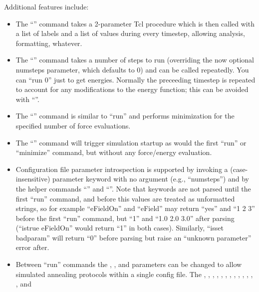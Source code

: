 Additional features include:
\begin{itemize}
 \item The ``'' command takes a 2-parameter Tcl procedure which
    is then called with a list of labels and a list of values during
    every timestep, allowing analysis, formatting, whatever.
 \item The ``'' command takes a number of steps to run (overriding the
    now optional numsteps parameter, which defaults to 0) and can be
    called repeatedly.  You can ``run 0'' just to get energies.
    Normally the preceeding timestep is repeated to account for any modifications to the
    energy function; this can be avoided with ``''.
 \item The ``'' command is similar to ``run'' and performs
    minimization for the specified number of force evaluations.
 \item The ``'' command will trigger simulation startup
    as would the first ``run'' or ``minimize'' command, but without any force/energy evaluation.
 \item Configuration file parameter introspection is supported by
   invoking a (case-insensitive) parameter keyword with no argument (e.g., ``numsteps'')
   and by the helper commands ``'' and ``''.
   Note that keywords are not parsed until the first ``run'' command, and
   before this values are treated as unformatted strings, so for example
   ``eFieldOn'' and ``eField'' may return ``yes'' and ``1 2 3'' before
   the first ``run'' command, but ``1'' and ``1.0 2.0 3.0'' after parsing
   (``istrue eFieldOn'' would return ``1'' in both cases).
   Similarly, ``isset badparam'' will return ``0'' before parsing
   but raise an ``unknown parameter'' error after.
 \item Between ``run'' commands the ,
    , and
     parameters can be changed to allow simulated
    annealing protocols within a single config file.
    The , ,
    , ,
    , ,
    , ,
    , ,
    , ,
    , and

\end{itemize}
